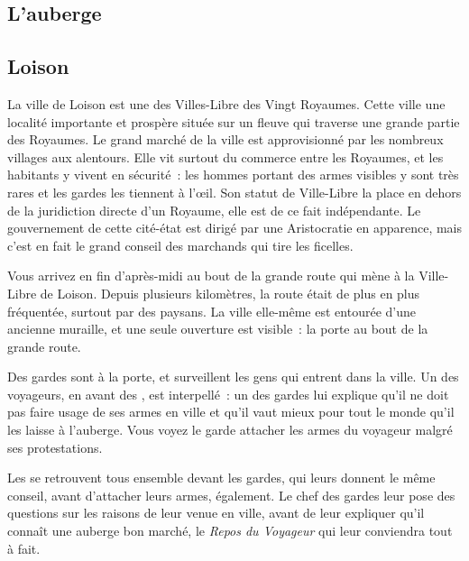 \documentclass[a4paper,10pt,openany]{book}
\begin{document}
\begin{multicols}{2}

\section{L’auberge}
\subsection{Loison}
La ville de Loison est une des Villes-Libre des Vingt Royaumes. Cette ville une localité importante et prospère située sur un fleuve qui traverse une
grande partie des Royaumes. Le grand marché de la ville est approvisionné par les nombreux villages aux alentours. Elle vit surtout du commerce entre
les Royaumes, et les habitants y vivent en sécurité : les hommes portant des armes visibles y sont très rares et les gardes les tiennent à l’œil. Son
statut de Ville-Libre la place en dehors de la juridiction directe d’un Royaume, elle est de ce fait indépendante. Le gouvernement de cette cité-état
est dirigé par une Aristocratie en apparence, mais c’est en fait le grand conseil des marchands qui tire les ficelles.

\begin{paperbox}{ }
	Vous arrivez en fin d’après-midi au bout de la grande route qui mène à la Ville-Libre de Loison. Depuis plusieurs kilomètres, la route était de plus 
	en plus fréquentée, surtout par des paysans. La ville elle-même est entourée d’une ancienne muraille, et une seule ouverture est visible : la porte
	au bout de la grande route.\par\noindent Des gardes sont à la porte, et surveillent les gens qui entrent dans la ville. Un des voyageurs, en avant des
	\PJs, est interpellé : un des gardes lui explique qu’il ne doit pas faire usage de ses armes en ville et qu’il vaut mieux pour tout le monde
	qu’il les laisse à l’auberge. Vous voyez le garde attacher les armes du voyageur malgré ses protestations.\par\noindent Les \PJs se retrouvent tous
	ensemble devant les gardes, qui leurs donnent le même conseil, avant d’attacher leurs armes, également. Le chef des gardes leur pose des questions
	sur les raisons de leur venue en ville, avant de leur expliquer qu’il connaît une auberge bon marché, le \emph{Repos du Voyageur} qui leur conviendra
	tout à fait.
\end{paperbox}


\end{multicols}
\end{document}
